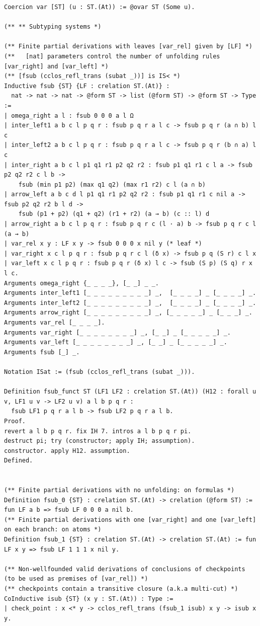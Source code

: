 \documentclass[10pt,a4paper]{article}
\begin{document}
\begin{lstlisting}
Coercion var [ST] (u : ST.(At)) := @ovar ST (Some u).

(** ** Subtyping systems *)

(** Finite partial derivations with leaves [var_rel] given by [LF] *)
(**   [nat] parameters control the number of unfolding rules [var_right] and [var_left] *)
(** [fsub (cclos_refl_trans (subat _))] is IS≺ *)
Inductive fsub {ST} {LF : crelation ST.(At)} :
  nat -> nat -> nat -> @form ST -> list (@form ST) -> @form ST -> Type :=
| omega_right a l : fsub 0 0 0 a l Ω
| inter_left1 a b c l p q r : fsub p q r a l c -> fsub p q r (a ∩ b) l c
| inter_left2 a b c l p q r : fsub p q r a l c -> fsub p q r (b ∩ a) l c
| inter_right a b c l p1 q1 r1 p2 q2 r2 : fsub p1 q1 r1 c l a -> fsub p2 q2 r2 c l b ->
    fsub (min p1 p2) (max q1 q2) (max r1 r2) c l (a ∩ b)
| arrow_left a b c d l p1 q1 r1 p2 q2 r2 : fsub p1 q1 r1 c nil a -> fsub p2 q2 r2 b l d ->
    fsub (p1 + p2) (q1 + q2) (r1 + r2) (a → b) (c :: l) d
| arrow_right a b c l p q r : fsub p q r c (l · a) b -> fsub p q r c l (a → b)
| var_rel x y : LF x y -> fsub 0 0 0 x nil y (* leaf *)
| var_right x c l p q r : fsub p q r c l (δ x) -> fsub p q (S r) c l x
| var_left x c l p q r : fsub p q r (δ x) l c -> fsub (S p) (S q) r x l c.
Arguments omega_right {_ _ _ _}, [_ _] _ _.
Arguments inter_left1 [_ _ _ _ _ _ _ _ _] _,  [_ _ _ _] _ [_ _ _ _] _.
Arguments inter_left2 [_ _ _ _ _ _ _ _ _] _,  [_ _ _ _] _ [_ _ _ _] _.
Arguments arrow_right [_ _ _ _ _ _ _ _ _] _, [_ _ _ _ _] _ [_ _ _] _.
Arguments var_rel [_ _ _ _].
Arguments var_right [_ _ _ _ _ _ _ _] _, [_ _] _ [_ _ _ _ _] _.
Arguments var_left [_ _ _ _ _ _ _ _] _, [_ _] _ [_ _ _ _ _] _.
Arguments fsub [_] _.

Notation ISat := (fsub (cclos_refl_trans (subat _))).

Definition fsub_funct ST (LF1 LF2 : crelation ST.(At)) (H12 : forall u v, LF1 u v -> LF2 u v) a l b p q r :
  fsub LF1 p q r a l b -> fsub LF2 p q r a l b.
Proof.
revert a l b p q r. fix IH 7. intros a l b p q r pi.
destruct pi; try (constructor; apply IH; assumption).
constructor. apply H12. assumption.
Defined.


(** Finite partial derivations with no unfolding: on formulas *)
Definition fsub_0 {ST} : crelation ST.(At) -> crelation (@form ST) := fun LF a b => fsub LF 0 0 0 a nil b.
(** Finite partial derivations with one [var_right] and one [var_left] on each branch: on atoms *)
Definition fsub_1 {ST} : crelation ST.(At) -> crelation ST.(At) := fun LF x y => fsub LF 1 1 1 x nil y.

(** Non-wellfounded valid derivations of conclusions of checkpoints (to be used as premises of [var_rel]) *)
(** checkpoints contain a transitive closure (a.k.a multi-cut) *)
CoInductive isub {ST} (x y : ST.(At)) : Type :=
| check_point : x ≺* y -> cclos_refl_trans (fsub_1 isub) x y -> isub x y.


\end{lstlisting}
\end{document}
